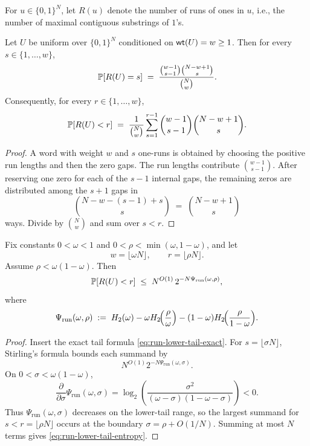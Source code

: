 \begin{definition}
\label{def:runs}
For $u\in\{0,1\}^N$, let $R(u)$ denote the number of runs of ones in $u$,
i.e., the number of maximal contiguous substrings of $1$'s.
\end{definition}

\begin{lemma}
\label{lem:run-count-distribution}
Let $U$ be uniform over $\{0,1\}^N$ conditioned on $\mathsf{wt}(U)=w\ge 1$.
Then for every $s\in\{1,\dots,w\}$,
\[
\mathbb{P}[R(U)=s]
\;=\;
\frac{\binom{w-1}{s-1}\binom{N-w+1}{s}}{\binom{N}{w}}.
\]
Consequently, for every $r\in\{1,\dots,w\}$,
\begin{equation}
\label{eq:run-lower-tail-exact}
\mathbb{P}[R(U)<r]
\;=\;
\frac{1}{\binom{N}{w}}
\sum_{s=1}^{r-1}
\binom{w-1}{s-1}\binom{N-w+1}{s}.
\end{equation}
\end{lemma}

\begin{proof}
A word with weight \(w\) and \(s\) one-runs is obtained by choosing the positive run lengths and then the zero gaps.
The run lengths contribute \(\binom{w-1}{s-1}\).  After reserving one zero for each of the \(s-1\) internal gaps, the
remaining zeros are distributed among the \(s+1\) gaps in
\[
\binom{N-w-(s-1)+s}{s}
\;=\;
\binom{N-w+1}{s}
\]
ways.  Divide by \(\binom{N}{w}\) and sum over \(s<r\).
\end{proof}

\begin{lemma}
\label{lem:run-lower-tail-entropy}
Fix constants \(0<\omega<1\) and \(0<\rho<\min(\omega,1-\omega)\), and let
\[
w=\lfloor \omega N\rfloor,
\qquad
r=\lfloor \rho N\rfloor.
\]
Assume \(\rho<\omega(1-\omega)\). Then
\begin{equation}
\label{eq:run-lower-tail-entropy}
\mathbb{P}[R(U)<r]
\;\le\;
N^{O(1)}\,2^{-N\Psi_{\mathrm{run}}(\omega,\rho)},
\end{equation}
where
\begin{equation}
\label{eq:run-rate-function}
\Psi_{\mathrm{run}}(\omega,\rho)
\;:=\;
H_2(\omega)
- \omega H_2\!\Bigl(\frac{\rho}{\omega}\Bigr)
- (1-\omega)H_2\!\Bigl(\frac{\rho}{1-\omega}\Bigr).
\end{equation}
\end{lemma}

\begin{proof}
Insert the exact tail formula \eqref{eq:run-lower-tail-exact}.  For \(s=\lfloor\sigma N\rfloor\), Stirling's formula
bounds each summand by
\[
N^{O(1)}2^{-N\Psi_{\mathrm{run}}(\omega,\sigma)}.
\]
On \(0<\sigma<\omega(1-\omega)\),
\[
\frac{\partial}{\partial\sigma}\Psi_{\mathrm{run}}(\omega,\sigma)
=
\log_2\!\left(\frac{\sigma^2}{(\omega-\sigma)(1-\omega-\sigma)}\right)<0.
\]
Thus \(\Psi_{\mathrm{run}}(\omega,\sigma)\) decreases on the lower-tail range, so the largest summand for
\(s<r=\lfloor\rho N\rfloor\) occurs at the boundary \(\sigma=\rho+O(1/N)\).  Summing at most \(N\) terms gives
\eqref{eq:run-lower-tail-entropy}.
\end{proof}

